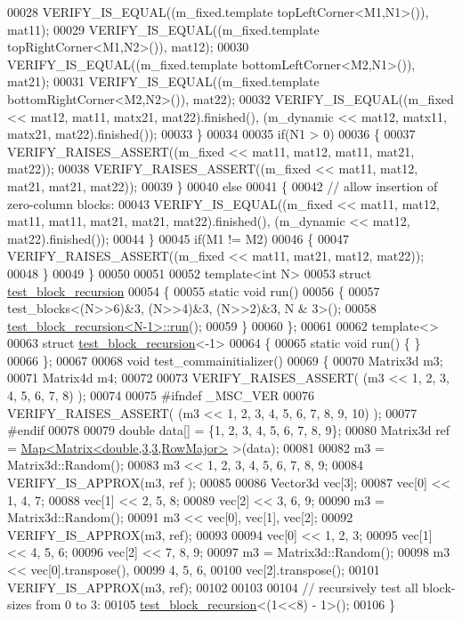 \begin{DoxyCode}
00028     VERIFY\_IS\_EQUAL((m\_fixed.template topLeftCorner<M1,N1>()), mat11);
00029     VERIFY\_IS\_EQUAL((m\_fixed.template topRightCorner<M1,N2>()), mat12);
00030     VERIFY\_IS\_EQUAL((m\_fixed.template bottomLeftCorner<M2,N1>()), mat21);
00031     VERIFY\_IS\_EQUAL((m\_fixed.template bottomRightCorner<M2,N2>()), mat22);
00032     VERIFY\_IS\_EQUAL((m\_fixed << mat12, mat11, matx21, mat22).finished(), (m\_dynamic << mat12, matx11, 
      matx21, mat22).finished());
00033   \}
00034 
00035   \textcolor{keywordflow}{if}(N1 > 0)
00036   \{
00037     VERIFY\_RAISES\_ASSERT((m\_fixed << mat11, mat12, mat11, mat21, mat22));
00038     VERIFY\_RAISES\_ASSERT((m\_fixed << mat11, mat12, mat21, mat21, mat22));
00039   \}
00040   \textcolor{keywordflow}{else}
00041   \{
00042     \textcolor{comment}{// allow insertion of zero-column blocks:}
00043     VERIFY\_IS\_EQUAL((m\_fixed << mat11, mat12, mat11, mat11, mat21, mat21, mat22).finished(), (m\_dynamic << 
      mat12, mat22).finished());
00044   \}
00045   \textcolor{keywordflow}{if}(M1 != M2)
00046   \{
00047     VERIFY\_RAISES\_ASSERT((m\_fixed << mat11, mat21, mat12, mat22));
00048   \}
00049 \}
00050 
00051 
00052 \textcolor{keyword}{template}<\textcolor{keywordtype}{int} N>
00053 \textcolor{keyword}{struct }\hyperlink{structtest__block__recursion}{test\_block\_recursion}
00054 \{
00055   \textcolor{keyword}{static} \textcolor{keywordtype}{void} run()
00056   \{
00057     test\_blocks<(N>>6)&3, (N>>4)&3, (N>>2)&3, N & 3>();
00058     \hyperlink{structtest__block__recursion}{test\_block\_recursion<N-1>::run}();
00059   \}
00060 \};
00061 
00062 \textcolor{keyword}{template}<>
00063 \textcolor{keyword}{struct }\hyperlink{structtest__block__recursion}{test\_block\_recursion}<-1>
00064 \{
00065   \textcolor{keyword}{static} \textcolor{keywordtype}{void} run() \{ \}
00066 \};
00067 
00068 \textcolor{keywordtype}{void} test\_commainitializer()
00069 \{
00070   Matrix3d m3;
00071   Matrix4d m4;
00072 
00073   VERIFY\_RAISES\_ASSERT( (m3 << 1, 2, 3, 4, 5, 6, 7, 8) );
00074   
00075 \textcolor{preprocessor}{  #ifndef \_MSC\_VER}
00076   VERIFY\_RAISES\_ASSERT( (m3 << 1, 2, 3, 4, 5, 6, 7, 8, 9, 10) );
00077 \textcolor{preprocessor}{  #endif}
00078 
00079   \textcolor{keywordtype}{double} data[] = \{1, 2, 3, 4, 5, 6, 7, 8, 9\};
00080   Matrix3d ref = \hyperlink{group___core___module_class_eigen_1_1_map}{Map<Matrix<double,3,3,RowMajor>} >(data);
00081 
00082   m3 = Matrix3d::Random();
00083   m3 << 1, 2, 3, 4, 5, 6, 7, 8, 9;
00084   VERIFY\_IS\_APPROX(m3, ref );
00085 
00086   Vector3d vec[3];
00087   vec[0] << 1, 4, 7;
00088   vec[1] << 2, 5, 8;
00089   vec[2] << 3, 6, 9;
00090   m3 = Matrix3d::Random();
00091   m3 << vec[0], vec[1], vec[2];
00092   VERIFY\_IS\_APPROX(m3, ref);
00093 
00094   vec[0] << 1, 2, 3;
00095   vec[1] << 4, 5, 6;
00096   vec[2] << 7, 8, 9;
00097   m3 = Matrix3d::Random();
00098   m3 << vec[0].transpose(),
00099         4, 5, 6,
00100         vec[2].transpose();
00101   VERIFY\_IS\_APPROX(m3, ref);
00102 
00103 
00104   \textcolor{comment}{// recursively test all block-sizes from 0 to 3:}
00105   \hyperlink{structtest__block__recursion}{test\_block\_recursion}<(1<<8) - 1>();
00106 \}
\end{DoxyCode}
